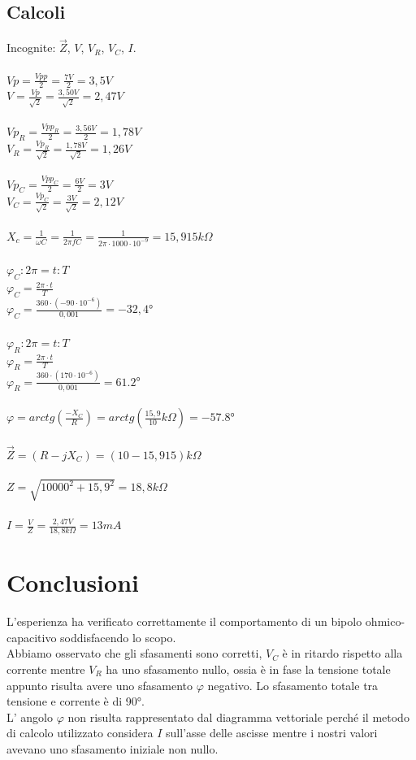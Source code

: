 \documentclass[12pt]{article}
\begin{document}
    \subsection{Calcoli}
    Incognite: $\vec{Z}$, $V$, $V_R$, $V_C$, $I$.\\
    \\
    $Vp=\frac{Vpp}{2}=\frac{7V}{2}=3,5V$\\
    $V=\frac{Vp}{\sqrt{2}}=\frac{3,50V}{\sqrt{2}}=2,47V$\\
    \\
    $Vp_R=\frac{Vpp_R}{2}=\frac{3,56V}{2}=1,78V$\\
    $V_R=\frac{Vp_R}{\sqrt{2}}=\frac{1,78V}{\sqrt{2}}=1,26V$\\
    \\
    $Vp_C=\frac{Vpp_C}{2}=\frac{6V}{2}=3V$\\
    $V_C=\frac{Vp_C}{\sqrt{2}}=\frac{3V}{\sqrt{2}}=2,12V$\\
    \\
    $X_c=\frac{1}{\omega C}=\frac{1}{2\pi f C}=\frac{1}{2\pi\cdot 1000 \cdot 10^{-9}}=15,915k\Omega$\\
    \\
    $\varphi_C:2\pi=t:T$ \\
    $\varphi_C=\frac{2\pi \cdot t}{T}$\\
    $\varphi_C=\frac{360 \cdot (-90\cdot 10^{-6})}{0,001}=-32,4$°\\
    \\
    $\varphi_R:2\pi=t:T$ \\
    $\varphi_R=\frac{2\pi \cdot t}{T}$\\
    $\varphi_R=\frac{360 \cdot (170\cdot 10^{-6})}{0,001}=61.2$°\\
    \\
    $\varphi=arctg(\frac{-X_C}{R})=arctg(\frac{15,9}{10}k\Omega)=-57.8$°\\
    \\
    $\vec{Z}=(R-jX_C)=(10-15,915)k\Omega$\\
    \\
    $Z=\sqrt{10000^2+15,9^2}=18,8k\Omega$\\
    \\
    $I=\frac{V}{Z}=\frac{2,47V}{18,8k\Omega}=13 mA$\\
\section{Conclusioni}
L'esperienza ha verificato correttamente il comportamento di un bipolo ohmico-capacitivo soddisfacendo lo scopo.\\
Abbiamo osservato che gli sfasamenti sono corretti, $V_C$ è in ritardo rispetto alla corrente mentre $V_R$ ha uno sfasamento nullo, ossia è in fase
la tensione totale appunto risulta avere uno sfasamento $\varphi$ negativo. Lo sfasamento totale tra tensione e corrente è di 90°.\\
L' angolo $\varphi$ non risulta rappresentato dal diagramma vettoriale perché il metodo di calcolo utilizzato considera $I$ sull'asse delle ascisse mentre i nostri valori
avevano uno sfasamento iniziale non nullo.
\end{document}
